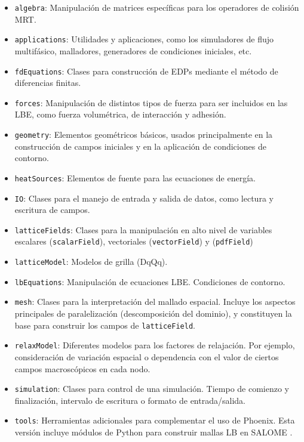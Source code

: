 \begin{itemize}
	\item \texttt{algebra}: Manipulaci\'on de matrices espec\'ificas para los operadores de colisi\'on MRT.
	\item \texttt{applications}: Utilidades y aplicaciones, como los simuladores de flujo multif\'asico, malladores, generadores de condiciones iniciales, etc.
	\item \texttt{fdEquations}: Clases para construcci\'on de EDPs mediante el m\'etodo de diferencias finitas.
	\item \texttt{forces}: Manipulaci\'on de distintos tipos de fuerza para ser incluidos en las LBE, como fuerza volum\'etrica, de interacci\'on y adhesi\'on.
	\item \texttt{geometry}: Elementos geom\'etricos b\'asicos, usados principalmente en la construcci\'on de campos iniciales y en la aplicaci\'on de condiciones de contorno.
	\item \texttt{heatSources}: Elementos de fuente para las ecuaciones de energ\'ia.
	\item \texttt{IO}: Clases para el manejo de entrada y salida de datos, como lectura y escritura de campos.
	\item \texttt{latticeFields}: Clases para la manipulaci\'on en alto nivel de variables escalares (\texttt{scalarField}), vectoriales (\texttt{vectorField}) y \fdp{} (\texttt{pdfField})
	\item \texttt{latticeModel}: Modelos de grilla (DqQq).
	\item \texttt{lbEquations}: Manipulaci\'on de ecuaciones LBE. Condiciones de contorno.
	\item \texttt{mesh}: Clases para la interpretaci\'on del mallado espacial. Incluye los aspectos principales de paralelizaci\'on (descomposici\'on del dominio), y constituyen la base para construir los campos de \texttt{latticeField}.
	\item \texttt{relaxModel}: Diferentes modelos para los factores de relajaci\'on. Por ejemplo, consideraci\'on de variaci\'on espacial o dependencia con el valor de ciertos campos macrosc\'opicos en cada nodo.
	\item \texttt{simulation}: Clases para control de una simulaci\'on. Tiempo de comienzo y finalizaci\'on, intervalo de escritura o formato de entrada/salida.
	\item \texttt{tools}: Herramientas adicionales para complementar el uso de Phoenix. Esta versi\'on incluye m\'odulos de Python para construir mallas LB en SALOME \cite{noauthor_salome_nodate}.
\end{itemize}




